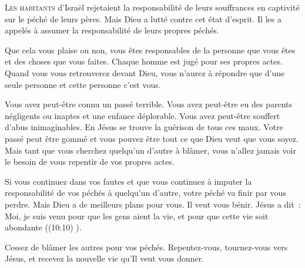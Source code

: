 \dvrule






\lettrine{L}{es habitants} d'Israël rejetaient la responsabilité
 de leurs souffrances en captivité sur le péché de leurs pères.
 Mais Dieu a lutté contre cet état d'esprit.
 Il les a appelés à assumer la responsabilité de leurs propres péchés. 

Que cela vous plaise ou non, vous êtes responsables de la personne
 que vous êtes et des choses que vous faites.
 Chaque homme est jugé pour ses propres actes.
 Quand vous vous retrouverez devant Dieu, 
 vous n'aurez à répondre que d'une seule personne
 \ocadr et cette personne c'est vous. 


Vous avez peut-être connu un passé terrible.
 Vous avez peut-être eu des parents négligents ou inaptes
 et une enfance déplorable. Vous avez peut-être souffert
 d'abus inimaginables. En Jésus se trouve la guérison de tous ces maux.
 Votre passé peut être gommé et vous pouvez être tout ce que Dieu
 veut que vous soyez. Mais tant que vous cherchez 
 quelqu'un d'autre à blâmer, vous n'allez jamais voir le besoin
 de vous repentir de vos propres actes. 

Si vous continuez dans vos fautes et que vous continuez
 à imputer la responsabilité de vos péchés à quelqu'un d'autre,
 votre péché va finir par vous perdre.
 Mais Dieu a de meilleurs plans pour vous. Il veut vous bénir.
 Jésus a dit~: 
 \Og Moi, je suis venu pour que les gens aient la vie,
 et pour que cette vie soit abondante \Fg{} ((10:10) \BFC). 

Cessez de blâmer les autres pour vos péchés.
 Repentez-vous, tournez-vous vers Jésus,
 et recevez la nouvelle vie qu'Il veut vous donner. 

